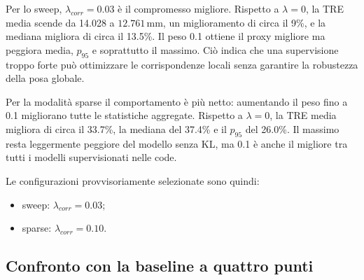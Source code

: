 \documentclass[11pt,a4paper]{article}
\newcommand{\SI}[2]{\ensuremath{#1\,#2}}
\newcommand{\milli}{\mathrm{m}}
\newcommand{\metre}{\mathrm{m}}
\begin{document}
Per lo sweep, $\lambda_{corr}=0.03$ è il compromesso migliore. Rispetto a
$\lambda=0$, la TRE media scende da 14.028 a
\SI{12.761}{\milli\metre}, un miglioramento di circa il 9\%, e la mediana
migliora di circa il 13.5\%. Il peso 0.1 ottiene il proxy migliore ma peggiora
media, $p_{95}$ e soprattutto il massimo. Ciò indica che una supervisione
troppo forte può ottimizzare le corrispondenze locali senza garantire la
robustezza della posa globale.

\begin{table}[ht]
\centering
\caption{Ablation di $\lambda_{corr}$ in modalità sparse, development seed 44.
Tutti gli errori lineari sono in millimetri.}
\end{table}

Per la modalità sparse il comportamento è più netto: aumentando il peso fino
a 0.1 migliorano tutte le statistiche aggregate. Rispetto a $\lambda=0$, la
TRE media migliora di circa il 33.7\%, la mediana del 37.4\% e il $p_{95}$ del
26.0\%. Il massimo resta leggermente peggiore del modello senza KL, ma 0.1 è
anche il migliore tra tutti i modelli supervisionati nelle code.

Le configurazioni provvisoriamente selezionate sono quindi:

\begin{itemize}
    \item sweep: $\lambda_{corr}=0.03$;
    \item sparse: $\lambda_{corr}=0.10$.
\end{itemize}

\subsection{Confronto con la baseline a quattro punti}
\end{document}
